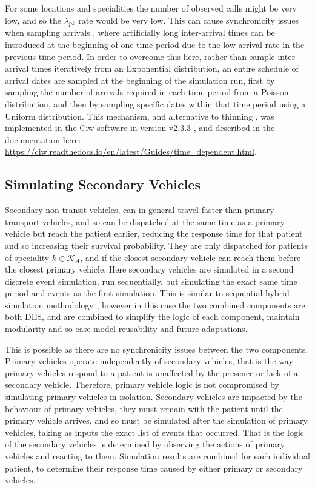 \documentclass[numbers,webpdf,imaman]{ima-authoring-template}%
\begin{document}
For some locations and specialities the number of observed calls might be very
low, and so the $\lambda_{pk}$ rate would be very low. This can cause
synchronicity issues when sampling arrivals \citep{pidd2004computer}, where
artificially long inter-arrival times can be introduced at the beginning of
one time period due to the low arrival rate in the previous time period.
In order to overcome this here, rather than sample inter-arrival times
iteratively from an Exponential distribution, an entire schedule of arrival
dates are sampled at the beginning of the simulation run, first by sampling
the number of arrivals required in each time period from a Poisson
distribution, and then by sampling specific dates within that time period
using a Uniform distribution.
This mechanism, and alternative to thinning \citep{lewisshedler79}, was
implemented in the Ciw software in version v2.3.3 \citep{ciw233}, and described
in the documentation here:
\url{https://ciw.readthedocs.io/en/latest/Guides/time_dependent.html}.


\subsection{Simulating Secondary Vehicles}\label{sec:simulation_secondary}
Secondary non-transit vehicles, can in general travel faster than primary
transport vehicles, and so can be dispatched at the same time as a primary
vehicle but reach the patient earlier, reducing the response time for that
patient and so increasing their survival probability. They are only dispatched
for patients of speciality $k \in \mathcal{K}_A$, and if the closest secondary
vehicle can reach them before the closest primary vehicle.
Here secondary vehicles are simulated in a second discrete event simulation,
run sequentially, but simulating the exact same time period and events as the
first simulation. This is similar to sequential hybrid simulation methodology
\citep{brailsfordetal19, morganetal17}, however in this case the two combined
components are both DES, and are combined to simplify the logic of each
component, maintain modularity and so ease model reusability and future
adaptations.

This is possible as there are no synchronicity issues between the two
components. Primary vehicles operate independently of secondary vehicles, that
is the way primary vehicles respond to a patient is unaffected by the presence
or lack of a secondary vehicle.
Therefore, primary vehicle logic is not compromised by simulating primary
vehicles in isolation.
Secondary vehicles are impacted by the behaviour of primary vehicles, they
must remain with the patient until the primary vehicle arrives, and so must be
simulated after the simulation of primary vehicles, taking as inputs the exact
list of events that occurred. That is the logic of the secondary vehicles is
determined by observing the actions of primary vehicles and reacting to them.
Simulation results are combined for each individual patient, to determine
their response time caused by either primary or secondary vehicles.
\end{document}
